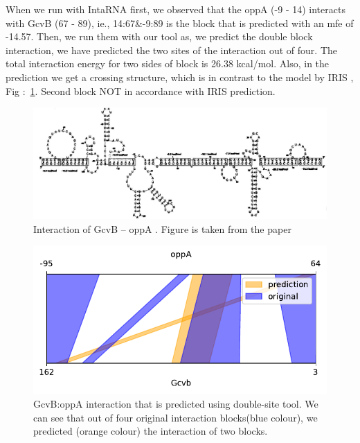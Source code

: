 \documentclass[twoside,a4paper]{report}
\numberwithin{equation}{section}
\begin{document}
    When we run with IntaRNA first, we observed that the oppA (-9 - 14) interacts with GcvB (67 - 89), ie., 14:67\&-9:89 is the block that is predicted with an mfe of -14.57. Then, we run them with our tool as, we predict the double block interaction, we have predicted the two sites of the interaction out of four. The total interaction energy for two sides of block is 26.38 kcal/mol. Also, in the prediction we get a crossing structure, which is in contrast to the model by IRIS , Fig :~\ref{fig:oppa}. Second block NOT in accordance with IRIS prediction. \\
	
		\begin{figure}[h!tb]
		\includegraphics[width=1.0\linewidth]{oppa}
		\centering
		\caption{ Interaction of GcvB – oppA . Figure is taken from the paper \citep{pervouchine2004iris}} 
		\label{fig:oppa}
	\end{figure}

	\begin{figure}[h!tb]
	\includegraphics[width=.5\linewidth]{rricomparison6}
	\centering
	\caption{ GcvB:oppA interaction that is predicted using double-site tool. We can see that out of four original interaction blocks(blue colour), we predicted (orange colour) the interaction of two blocks. } 
	\label{fig:rricomparison6}
\end{figure}


\clearpage
	
%	
	
\end{document}
